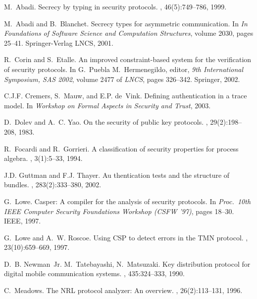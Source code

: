 \documentclass{entcs} \usepackage{entcsmacro}
\begin{document}
\begin{thebibliography}{10}

M.~Abadi.
\newblock Secrecy by typing in security protocols.
, 46(5):749--786, 1999.

M.~Abadi and B.~Blanchet.
\newblock Secrecy types for asymmetric communication.
\newblock In {\em In Foundations of Software Science and Computation
  Structures}, volume 2030, pages 25--41. Springer-Verlag LNCS, 2001.

R.~Corin and S.~Etalle.
\newblock An improved constraint-based system for the verification of security
  protocols.
\newblock In G.~Puebla M.~Hermenegildo, editor, {\em 9th International
  Symposium, SAS 2002}, volume 2477 of {\em LNCS}, pages 326--342. Springer,
  2002.

C.J.F. Cremers, S.~Mauw, and E.P. de~Vink.
\newblock Defining authentication in a trace model.
\newblock In {\em Workshop on Formal Aspects in Security and Trust}, 2003.

D.~Dolev and A.~C. Yao.
\newblock On the security of public key protocols.
, 29(2):198--208,
  1983.

R.~Focardi and R.~Gorrieri.
\newblock A classification of security properties for process algebra.
, 3(1):5--33, 1994.

J.D. Guttman and F.J. Thayer.
\newblock Au thentication tests and the structure of bundles.
, 283(2):333--380, 2002.

G.~Lowe.
\newblock Casper: {A} compiler for the analysis of security protocols.
\newblock In {\em Proc.\ 10th {IEEE} Computer Security Foundations Workshop
  ({CSFW} '97)}, pages 18--30. IEEE, 1997.

G.~Lowe and A.~W. Roscoe.
\newblock Using {CSP} to detect errors in the {TMN} protocol.
, 23(10):659--669, 1997.

D.~B. Newman~Jr. M.~Tatebayashi, N.~Matsuzaki.
\newblock Key distribution protocol for digital mobile communication systems.
,
  435:324--333, 1990.

C.~Meadows.
\newblock The {NRL} protocol analyzer: An overview.
, 26(2):113--131, 1996.


\end{thebibliography}
\end{document}
